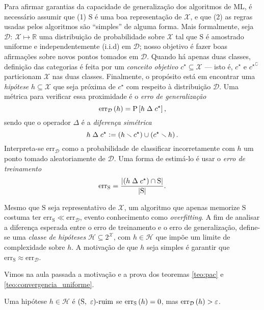 Para afirmar garantias da capacidade de generalização dos algoritmos de ML, é necessário assumir que (1) $\mathrm{S}$ é uma boa representação de $\mathcal{X}$, e que (2) as regras usadas pelos algoritmos são ``simples'' de alguma forma. Mais formalmente, seja $\mathcal{D}\colon\ \mathcal{X}\mapsto\mathds{R}$ uma distribuição de probabilidade sobre $\mathcal{X}$ tal que $\mathrm{S}$ é amostrado uniforme e independentemente (i.i.d) em $\mathcal{D}$; nosso objetivo é fazer boas afirmações sobre novos pontos tomados em $\mathcal{D}$. Quando há apenas duas classes, definição das categorias é feita por um \textit{conceito objetivo} $c^\star\subseteq\mathcal{X}$ --- isto é, $c^\star$ e ${c^\star}^\complement$ particionam $\mathcal{X}$ nas duas classes. Finalmente, o propósito está em encontrar uma \textit{hipótese} $h\subseteq\mathcal{X}$ que seja próxima de $c^\star$ com respeito à distribuição $\mathcal{D}$. Uma métrica para verificar essa proximidade é o \textit{erro de generalização}
\[
  \mathrm{err}_\mathcal{D}\left(h\vphantom{1j}\right)=\mathrm{P}\left[h\mathrel{\Delta}c^\star\vphantom{1j}\right],
\]
sendo que o operador $\Delta$ é a \textit{diferença simétrica}
\[
  h\mathrel{\Delta}c^\star\vcentcolon=\left(h\setminus c^\star\vphantom{1j}\right)\cup\left(c^\star\setminus h\vphantom{1j}\right).
\]
Interpreta-se $\mathrm{err}_\mathcal{D}$ como a probabilidade de classificar incorretamente com $h$ um ponto tomado aleatoriamente de $\mathcal{D}$. Uma forma de estimá-lo é usar o \textit{erro de treinamento}
\[
  \mathrm{err}_\mathrm{S}=\frac{\left|\left(h\mathrel{\Delta}c^\star\vphantom{1j}\right)\cap\mathrm{S}\vphantom{1j}\right|}{\left|\mathrm{S}\vphantom{1j}\right|}.
\]

Mesmo que $\mathrm{S}$ seja representativo de $\mathcal{X}$, um algoritmo que apenas memorize $\mathrm{S}$ costuma ter $\mathrm{err}_\mathrm{S}\ll\mathrm{err}_\mathcal{D}$, evento conhecimento como \textit{overfitting}. A fim de analisar a diferença esperada entre o erro de treinamento e o erro de generalização, define-se uma \textit{classe de hipóteses} $\mathcal{H}\subseteq 2^\mathcal{X}$, com $h\in\mathcal{H}$ que impõe um limite de complexidade sobre $h$. A motivação de que $h$ seja simples é garantir que $\mathrm{err}_\mathrm{S}\approx\mathrm{err}_\mathcal{D}$.

Vimos na aula passada a motivação e a prova dos teoremas \autoref{teo:pac} e \autoref{teo:convergencia_uniforme}.

\begin{definicao}
  Uma hipótese $h\in\mathcal{H}$ é $\left(\mathrm{S},\ \eps\vphantom{1j}\right)\!\text{-ruim}$ se $\mathrm{err}_\mathrm{S}\left(h\vphantom{1j}\right)=0$, mas $\mathrm{err}_\mathcal{D}\left(h\vphantom{1j}\right)>\eps$.
\end{definicao}

